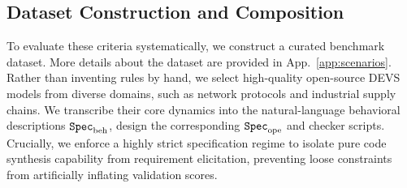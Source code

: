 
\subsection{Dataset Construction and Composition}
\label{sec:dataset}


To evaluate these criteria systematically, we construct a curated benchmark dataset. More details about the dataset are provided in App.~\ref{app:scenarios}.
Rather than inventing rules by hand, we select high-quality open-source DEVS models from diverse domains, such as network protocols and industrial supply chains. We transcribe their core dynamics into the natural-language behavioral descriptions ${\texttt{Spec}}_{\mathrm{beh}}$, design the corresponding ${\texttt{Spec}}_{\mathrm{ope}}$ and checker scripts. Crucially, we enforce a highly strict specification regime to isolate pure code synthesis capability from requirement elicitation, preventing loose constraints from artificially inflating validation scores.


